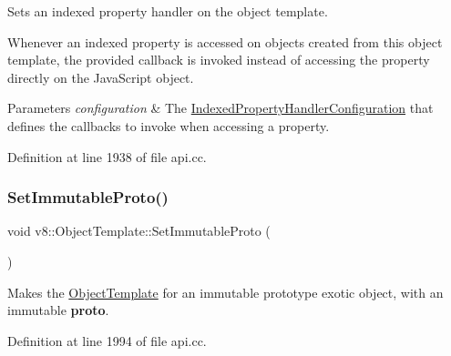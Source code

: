 Sets an indexed property handler on the object template.

Whenever an indexed property is accessed on objects created from this object template, the provided callback is invoked instead of accessing the property directly on the Java\+Script object.


\begin{DoxyParams}{Parameters}
{\em configuration} & The \mbox{\hyperlink{structv8_1_1IndexedPropertyHandlerConfiguration}{Indexed\+Property\+Handler\+Configuration}} that defines the callbacks to invoke when accessing a property. \\
\hline
\end{DoxyParams}


Definition at line 1938 of file api.\+cc.

\mbox{\label{classv8_1_1ObjectTemplate_adba49230a24b42f0985494ac86655e54}} 
\subsubsection{\texorpdfstring{Set\+Immutable\+Proto()}{SetImmutableProto()}}
{\footnotesize\ttfamily void v8\+::\+Object\+Template\+::\+Set\+Immutable\+Proto (\begin{DoxyParamCaption}{ }\end{DoxyParamCaption})}

Makes the \mbox{\hyperlink{classv8_1_1ObjectTemplate}{Object\+Template}} for an immutable prototype exotic object, with an immutable {\bfseries proto}. 

Definition at line 1994 of file api.\+cc.

\mbox{\label{classv8_1_1ObjectTemplate_a7b426fe5c637216d45f2915ce96b0027}} 

